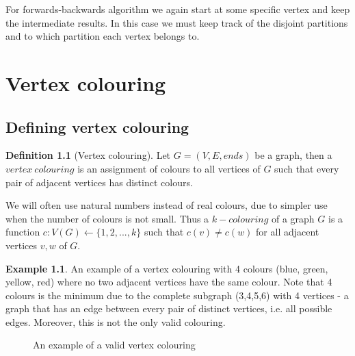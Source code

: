 \documentclass{report}
\theoremstyle{plain}
\theoremstyle{definition}
\newtheorem{definition}{Definition}
\newtheorem{example}{Example}
\theoremstyle{remark}
\numberwithin{definition}{chapter}
\numberwithin{example}{chapter}
\numberwithin{figure}{chapter}
\numberwithin{theorem}{chapter}
\numberwithin{lemma}{chapter}
\begin{document}
For forwards-backwards algorithm we again start at some specific vertex and keep the intermediate results. In this case we must keep track of the disjoint partitions and to which partition each vertex belongs to.

\chapter{Vertex colouring}

\section{Defining vertex colouring}

\begin{definition}[Vertex colouring]
Let $G=(V, E, ends)$ be a graph, then a $vertex \ colouring$ is an assignment of colours to all vertices of $G$ such that every pair of adjacent vertices has distinct colours. 
\end{definition}

We will often use natural numbers instead of real colours, due to simpler use when the number of colours is not small. Thus a $k-colouring$ of a graph $G$ is a function $c: V(G) \leftarrow \{1, 2,..., k\}$ such that $c(v) \not = c(w)$ for all adjacent vertices $v,w$ of $G$.

\begin{example}

An example of a vertex colouring with 4 colours (blue, green, yellow, red) where no two adjacent vertices have the same colour. Note that 4 colours is the minimum due to the complete subgraph (3,4,5,6) with 4 vertices - a graph that has an edge between every pair of distinct vertices, i.e. all possible edges. Moreover, this is not the only valid colouring.

\begin{figure}[h]
\center
{}
\caption{An example of a valid vertex colouring}
\end{figure}
\label{VC_example}
\end{example}
\end{document}
